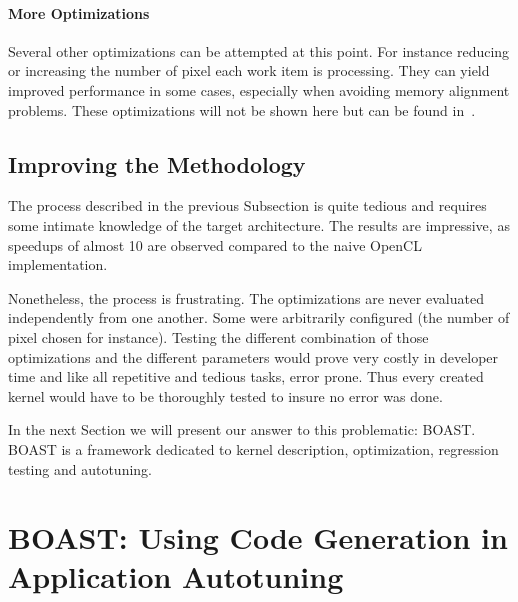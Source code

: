 \documentclass[11pt, a4paper, twoside]{montblanc}
\begin{document}
\paragraph{More Optimizations} Several other optimizations can be attempted at
this point. For instance reducing or increasing the number of pixel each work
item is processing. They can yield improved performance in some cases, especially
when avoiding memory alignment problems. These optimizations will not be shown
here but can be found in~\cite{opencl_arm_training}.

\subsection{Improving the Methodology}

The process described in the previous Subsection is quite tedious and requires
some intimate knowledge of the target architecture. The results are impressive,
as speedups of almost 10 are observed compared to the naive OpenCL
implementation.

Nonetheless, the process is frustrating. The optimizations are never evaluated
independently from one another. Some were arbitrarily configured (the number of
pixel chosen for instance). Testing the different combination of those
optimizations and the different parameters would prove very costly in developer
time and like all repetitive and tedious tasks, error prone. Thus every created
kernel would have to be thoroughly tested to insure no error was done.

In the next Section we will present our answer to this problematic: BOAST.
BOAST is a framework dedicated to kernel description, optimization, regression testing
and autotuning.

\section{BOAST: Using Code Generation in Application Autotuning}
\end{document}
